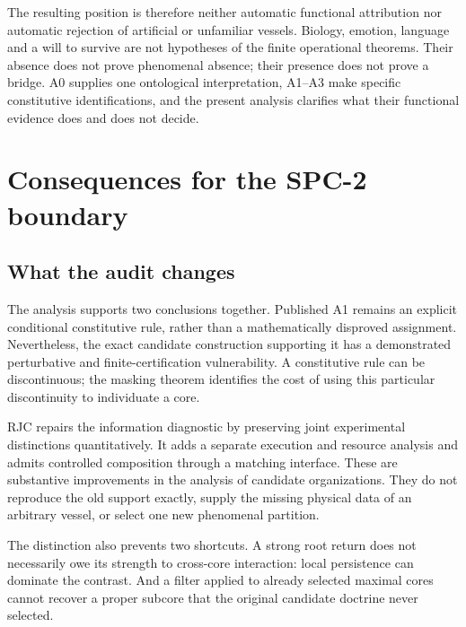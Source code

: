 The resulting position is therefore neither automatic functional attribution nor automatic rejection of artificial or unfamiliar vessels. Biology, emotion, language and a will to survive are not hypotheses of the finite operational theorems. Their absence does not prove phenomenal absence; their presence does not prove a bridge. A0 supplies one ontological interpretation, A1--A3 make specific constitutive identifications, and the present analysis clarifies what their functional evidence does and does not decide.



\section{Consequences for the SPC-2 boundary}\label{sec:consequences}
\subsection{What the audit changes}
The analysis supports two conclusions together. Published A1 remains an explicit conditional constitutive rule, rather than a mathematically disproved assignment. Nevertheless, the exact candidate construction supporting it has a demonstrated perturbative and finite-certification vulnerability. A constitutive rule can be discontinuous; the masking theorem identifies the cost of using this particular discontinuity to individuate a core.

RJC repairs the information diagnostic by preserving joint experimental distinctions quantitatively. It adds a separate execution and resource analysis and admits controlled composition through a matching interface. These are substantive improvements in the analysis of candidate organizations. They do not reproduce the old support exactly, supply the missing physical data of an arbitrary vessel, or select one new phenomenal partition.

The distinction also prevents two shortcuts. A strong root return does not necessarily owe its strength to cross-core interaction: local persistence can dominate the contrast. And a filter applied to already selected maximal cores cannot recover a proper subcore that the original candidate doctrine never selected.

